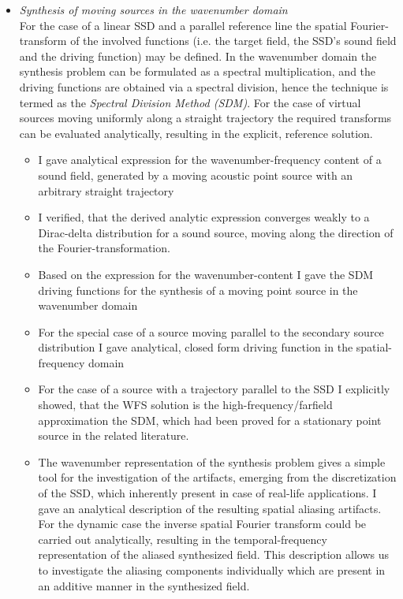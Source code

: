 \documentclass[a4paper,10pt]{article}
\begin{document}
\begin{itemize}
\item \emph{Synthesis of moving sources in the wavenumber domain\\}
For the case of a linear SSD and a parallel reference line the spatial Fourier-transform of the involved functions (i.e. the target field, the SSD's sound field and the driving function) may be defined. In the wavenumber domain the synthesis problem can be formulated as a spectral multiplication, and the driving functions are obtained via a spectral division, hence the technique is termed as the \emph{Spectral Division Method (SDM)}. For the case of virtual sources moving uniformly along a straight trajectory the required transforms can be evaluated analytically, resulting in the explicit, reference solution.
	\begin{itemize}
	\item I gave analytical expression for the wavenumber-frequency content of a sound field, generated by a moving acoustic point source with an arbitrary straight trajectory
	\item I verified, that the derived analytic expression converges weakly to a Dirac-delta distribution for a sound source, moving along the direction of the Fourier-transformation.
	\item Based on the expression for the wavenumber-content I gave the SDM driving functions for the synthesis of a moving point source in the wavenumber domain
	\item For the special case of a source moving parallel to the secondary source distribution I gave analytical, closed form driving function in the spatial-frequency domain
	\item For the case of a source with a trajectory parallel to the SSD I explicitly showed, that the WFS solution is the high-frequency/farfield approximation the SDM, which had been proved for a stationary point source in the related literature.
	\item The wavenumber representation of the synthesis problem gives a simple tool for the investigation of the artifacts, emerging from the discretization of the SSD, which inherently present in case of real-life applications. I gave an analytical description of the resulting spatial aliasing artifacts. For the dynamic case the inverse spatial Fourier transform could be carried out analytically, resulting in the temporal-frequency representation of the aliased synthesized field. This description allows us to investigate the aliasing components individually which are present in an additive manner in the synthesized field.

\end{itemize}
\end{itemize}
\end{document}
